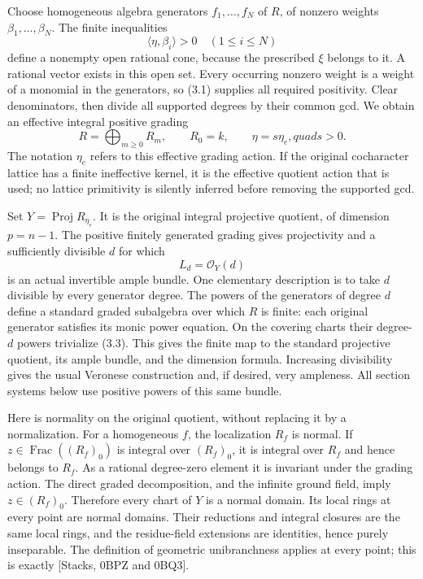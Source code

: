 \documentclass[
  10pt,
]{article}
\begin{document}
Choose homogeneous algebra generators \(f_1,\ldots,f_N\) of \(R\), of
nonzero weights \(\beta_1,\ldots,\beta_N\). The finite inequalities \[
                 \langle\eta,\beta_i\rangle>0\quad(1\leq i\leq N)
                                                               \tag{3.1}
\] define a nonempty open rational cone, because the prescribed \(\xi\)
belongs to it. A rational vector exists in this open set. Every
occurring nonzero weight is a weight of a monomial in the generators, so
(3.1) supplies all required positivity. Clear denominators, then divide
all supported degrees by their common gcd. We obtain an effective
integral positive grading \[
 R=\bigoplus_{m\geq0}R_m,\qquad R_0=k,\qquad
                     \eta=s\eta_e,quad s>0.                    \tag{3.2}
\] The notation \(\eta_e\) refers to this effective grading action. If
the original cocharacter lattice has a finite ineffective kernel, it is
the effective quotient action that is used; no lattice primitivity is
silently inferred before removing the supported gcd.

Set \(Y=\operatorname{Proj}R_{\eta_e}\). It is the original integral
projective quotient, of dimension \(p=n-1\). The positive finitely
generated grading gives projectivity and a sufficiently divisible \(d\)
for which \[
                       L_d=\mathcal O_Y(d)                     \tag{3.3}
\] is an actual invertible ample bundle. One elementary description is
to take \(d\) divisible by every generator degree. The powers of the
generators of degree \(d\) define a standard graded subalgebra over
which \(R\) is finite: each original generator satisfies its monic power
equation. On the covering charts their degree-\(d\) powers trivialize
(3.3). This gives the finite map to the standard projective quotient,
its ample bundle, and the dimension formula. Increasing divisibility
gives the usual Veronese construction and, if desired, very ampleness.
All section systems below use positive powers of this same bundle.

Here is normality on the original quotient, without replacing it by a
normalization. For a homogeneous \(f\), the localization \(R_f\) is
normal. If \(z\in\operatorname{Frac}((R_f)_0)\) is integral over
\((R_f)_0\), it is integral over \(R_f\) and hence belongs to \(R_f\).
As a rational degree-zero element it is invariant under the grading
action. The direct graded decomposition, and the infinite ground field,
imply \(z\in(R_f)_0\). Therefore every chart of \(Y\) is a normal
domain. Its local rings at every point are normal domains. Their
reductions and integral closures are the same local rings, and the
residue-field extensions are identities, hence purely inseparable. The
definition of geometric unibranchness applies at every point; this is
exactly {[}Stacks, 0BPZ and 0BQ3{]}.
\end{document}
